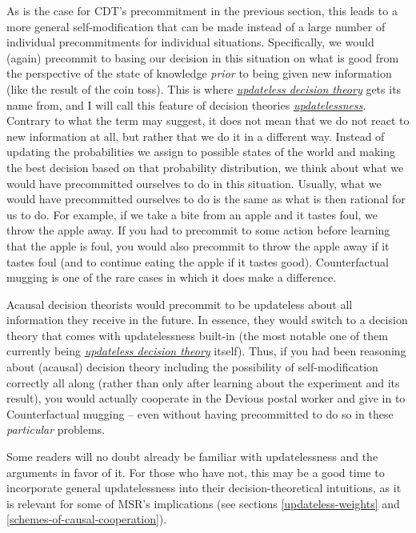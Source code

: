 As is the case for CDT's precommitment in the previous section, this
leads to a more general self-modification that can be made instead of a
large number of individual precommitments for individual situations.
Specifically, we would (again) precommit to basing our decision in this
situation on what is good from the perspective of the state of knowledge
\emph{prior} to being given new information (like the result of the coin
toss). This is where
\href{https://wiki.lesswrong.com/wiki/Updateless_decision_theory}{\emph{updateless
decision theory}} gets its name from, and I will call this feature of
decision theories
\href{https://casparoesterheld.com/2016/11/21/thoughts-on-updatelessnes/}{\emph{updatelessness}}.
Contrary to what the term may suggest, it does not mean that we do not
react to new information at all, but rather that we do it in a different
way. Instead of updating the probabilities we assign to possible states
of the world and making the best decision based on that probability
distribution, we think about what we would have precommitted ourselves
to do in this situation. Usually, what we would have precommitted
ourselves to do is the same as what is then rational for us to do. For
example, if we take a bite from an apple and it tastes foul, we throw
the apple away. If you had to precommit to some action before learning
that the apple is foul, you would also precommit to throw the apple away
if it tastes foul (and to continue eating the apple if it tastes good).
Counterfactual mugging is one of the rare cases in which it does make a
difference.

Acausal decision theorists would precommit to be updateless about all
information they receive in the future. In essence, they would switch to
a decision theory that comes with updatelessness built-in (the most
notable one of them currently being
\href{https://wiki.lesswrong.com/wiki/Updateless_decision_theory}{\emph{updateless
decision theory}}
\parencite{Benson-Tilsen2014-cv,Hintze2014-xs,McAllister_undated-ms}
itself). Thus, if you had been reasoning about (acausal) decision theory
including the possibility of self-modification correctly all along
(rather than only after learning about the experiment and its result),
you would actually cooperate in the Devious postal worker and give in to
Counterfactual mugging -- even without having precommitted to do so in
these \emph{particular} problems.

Some readers will no doubt already be familiar with updatelessness and
the arguments in favor of it. For those who have not, this may be a good
time to incorporate general updatelessness into their
decision-theoretical intuitions, as it is relevant for some of MSR's
implications (see sections
\ref{updateless-weights}
and \ref{schemes-of-causal-cooperation}).

